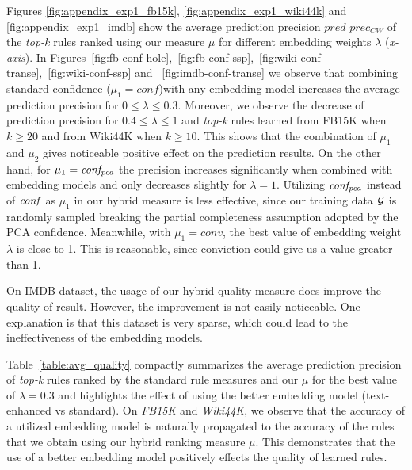 Figures \ref{fig:appendix_exp1_fb15k}, \ref{fig:appendix_exp1_wiki44k} and \ref{fig:appendix_exp1_imdb} show the %
average prediction precision $pred\_prec_{CW}$ of the \textit{top-k} rules ranked using our measure $\mu$ for different embedding weights $\lambda$ (\textit{x-axis}). 
In Figures~\ref{fig:fb-conf-hole},~\ref{fig:fb-conf-ssp},~\ref{fig:wiki-conf-transe},~\ref{fig:wiki-conf-ssp} and ~\ref{fig:imdb-conf-transe} %
we observe that combining standard confidence ($\mu_1 = conf$)with any %
embedding model %
increases the average prediction precision for %
$0\leq \lambda\leq 0.3$. %
Moreover, we observe the decrease of prediction precision for $0.4 \leq \lambda\leq 1$ and \textit{top-k} rules learned from FB15K when $k\geq 20$ %
and from Wiki44K when $k\geq 10$. %
This %
shows that the combination of $\mu_1$ and $\mu_2$ gives noticeable positive effect %
on the prediction results. On the other hand, for $\mu_1=\mathit{conf_{pca}}$ the precision increases significantly when combined with embedding models and only decreases slightly %
for $\lambda=1$. 
Utilizing $\mathit{conf_{pca}}$ instead of $\mathit{conf}$ as $\mu_1$ in our hybrid measure is less effective, since 
our training data $\mathcal{G}$ is randomly sampled %
breaking the %
partial completeness assumption adopted by the PCA confidence. Meanwhile, with $\mu_1 = conv$, the best value of embedding weight $\lambda$ is close to 1. This is reasonable, since conviction could give us a value greater than 1.

On IMDB dataset, the usage of our hybrid quality measure does improve the quality of result. However, the improvement is not easily noticeable. One explanation is that this dataset is very sparse, which could lead to the ineffectiveness of the embedding models.



Table~\ref{table:avg_quality} compactly summarizes the average prediction precision of \textit{top-k} rules ranked by
the standard rule measures and our $\mu$ for the best value of $\lambda=0.3$ and highlights the effect of using the better embedding model (text-enhanced vs standard).
On \textit{FB15K} and \textit{Wiki44K}, we observe that the accuracy of a utilized embedding model is naturally propagated to the accuracy of the rules that we obtain using our hybrid ranking measure $\mu$. This demonstrates that the use of a better embedding model positively effects %
the quality of learned rules. 

